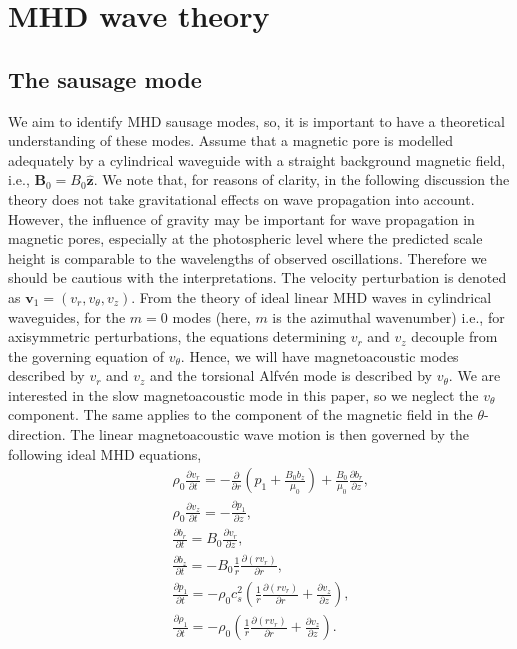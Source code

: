 \section{MHD wave theory}
\label{Wave}
    
    \subsection{The sausage mode}
    
    We aim to identify MHD sausage modes, so, it is important to have a theoretical understanding of these modes.
    Assume that a magnetic pore is modelled adequately by a cylindrical waveguide with a straight background magnetic field, i.e., $\textbf{B}_0=B_0\hat{\textbf{z}}$.
    We	note that, for reasons of clarity, in the following discussion the theory does not take gravitational effects on wave propagation into account.
    However, the influence of gravity may be important for wave propagation in magnetic pores, especially at the photospheric level where the predicted scale height is comparable to the wavelengths of observed oscillations.
    Therefore we should be cautious with the interpretations.
    The velocity perturbation is denoted as $\textbf{v}_1= (v_r,v_{\theta},v_z)$.
    From the theory of ideal linear MHD waves in cylindrical waveguides, for the $m=0$ modes (here, $m$ is the azimuthal wavenumber) i.e., for axisymmetric perturbations, the equations determining $v_r$ and $v_z$ decouple from the governing equation of $v_{\theta}$.
    Hence, we will have magnetoacoustic modes described by $v_r$ and $v_z$ and the torsional Alfv\'en mode is described by $v_{\theta}$.
    We are interested in the slow magnetoacoustic mode in this paper, so we neglect the $v_{\theta}$ component.
    The	same applies to the component of the magnetic field in the $\theta$-direction. 
    The linear magnetoacoustic wave motion is then governed by the following ideal MHD equations,
    \begin{align}
        &&\rho_0 \frac{\partial v_r}{\partial t}=-\frac{\partial}{\partial r}
        \left(p_1+\frac{B_0b_z}{\mu_0}\right)+\frac{B_0}{\mu_0}\frac{\partial b_r}{\partial z},
        \label{eq:mom_r}\\
        &&\rho_0\frac{\partial v_z}{\partial t}=-\frac{\partial p_1}{\partial z},
        \label{eq:mom_z}\\
        &&\frac{\partial b_r}{\partial t}=B_0\frac{\partial v_r}{\partial z},
        \label{eq:mag_r}\\
        &&\frac{\partial b_z}{\partial t}=-B_0\frac{1}{r}\frac{\partial (rv_r)}{\partial r},
        \label{eq:mag_z}\\
        &&\frac{\partial p_1}{\partial t}=-\rho_0
        c_s^2\left(\frac{1}{r}\frac{\partial(rv_r)}{\partial r}+\frac{\partial v_z}{\partial z}\right),
        \label{eq:press1}\\
        &&\frac{\partial \rho_1}{\partial t}=-\rho_0\left(\frac{1}{r}\frac{\partial (rv_r)}{\partial r}+\frac{\partial v_z}{\partial z}\right).
        \label{eq:den}
    \end{align}
